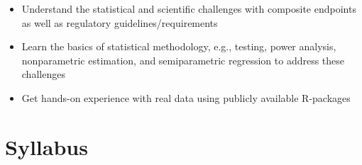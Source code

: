\documentclass[
  letterpaper,
  DIV=11,
  numbers=noendperiod]{scrreprt}
\providecommand{\tightlist}{%
  \setlength{\itemsep}{0pt}\setlength{\parskip}{0pt}}\usepackage{longtable,booktabs,array}
\begin{document}

\begin{itemize}
\tightlist
\item
  Understand the statistical and scientific challenges with composite
  endpoints as well as regulatory guidelines/requirements
\item
  Learn the basics of statistical methodology, e.g., testing, power
  analysis, nonparametric estimation, and semiparametric regression to
  address these challenges
\item
  Get hands-on experience with real data using publicly available
  R-packages
\end{itemize}

\hypertarget{syllabus}{%
\section*{Syllabus}\label{syllabus}}

\end{document}
